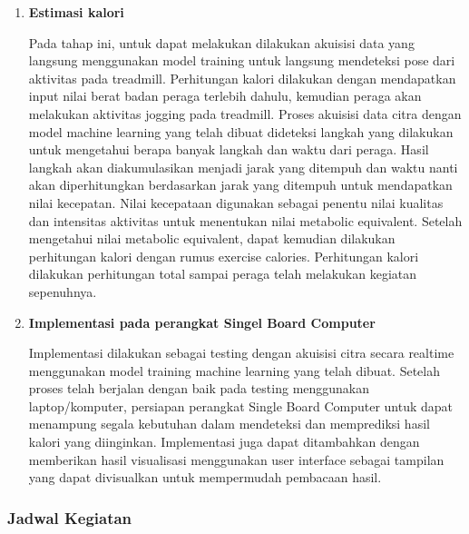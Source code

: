 \begin{enumerate} [label=\textbf{\arabic*}., listparindent=2em]
  Setelah dilakukan training dan klasifikasi, akan didapat model deteksi yang diinginkan. Bentuk hasil klasifikasi yang dibuat adalah mendeteksi pose aktivitas dengan dapat menghitung langkah dan waktu yang ditempuh. Nilai langkah dan waktu yang ditempuh akan digunakan dalam perhitungan selanjutnya.

  \item \textbf{Estimasi kalori}
  
  Pada tahap ini, untuk dapat melakukan dilakukan akuisisi data yang langsung menggunakan model training untuk langsung mendeteksi pose dari aktivitas pada treadmill. Perhitungan kalori dilakukan dengan mendapatkan input nilai berat badan peraga terlebih dahulu, kemudian peraga akan melakukan aktivitas jogging pada treadmill. Proses akuisisi data citra dengan model machine learning yang telah dibuat dideteksi langkah yang dilakukan untuk mengetahui berapa banyak langkah dan waktu dari peraga. Hasil langkah akan diakumulasikan menjadi jarak yang ditempuh dan waktu nanti akan diperhitungkan berdasarkan jarak yang ditempuh untuk mendapatkan nilai kecepatan. Nilai kecepataan digunakan sebagai penentu nilai kualitas dan intensitas aktivitas untuk menentukan nilai metabolic equivalent. Setelah mengetahui nilai metabolic equivalent, dapat kemudian dilakukan perhitungan kalori dengan rumus exercise calories. Perhitungan kalori dilakukan perhitungan total sampai peraga telah melakukan kegiatan sepenuhnya.

  \item \textbf{Implementasi pada perangkat Singel Board Computer}
  
  Implementasi dilakukan sebagai testing dengan akuisisi citra secara realtime menggunakan model training machine learning yang telah dibuat. Setelah proses telah berjalan dengan baik pada testing menggunakan laptop/komputer, persiapan perangkat Single Board Computer untuk dapat menampung segala kebutuhan dalam mendeteksi dan memprediksi hasil kalori yang diinginkan. Implementasi juga dapat ditambahkan dengan memberikan hasil visualisasi menggunakan user interface sebagai tampilan yang dapat divisualkan untuk mempermudah pembacaan hasil.


\end{enumerate}

\subsubsection{Jadwal Kegiatan}


